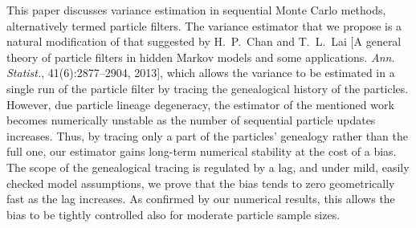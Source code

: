 This paper discusses variance estimation in sequential Monte Carlo methods, alternatively termed particle filters. The variance estimator that we propose is a natural modification of that suggested by H.~P.~Chan and T.~L.~Lai [A general theory of particle filters in hidden Markov models and some applications. \emph{Ann. Statist.}, 41(6):2877--2904, 2013], which allows the variance to be estimated in a single run of the particle filter by tracing the genealogical history of the particles. However, due particle lineage degeneracy, the estimator of the mentioned work becomes numerically unstable as the number of sequential particle updates increases. Thus, by tracing only a part of the particles' genealogy rather than the full one, our estimator gains long-term numerical stability at the cost of a bias. The scope of the genealogical tracing is regulated by a lag, and under mild, easily checked model assumptions, we prove that the bias tends to zero geometrically fast as the lag increases. As confirmed by our numerical results, this allows the bias to be tightly controlled also for moderate particle sample sizes. 